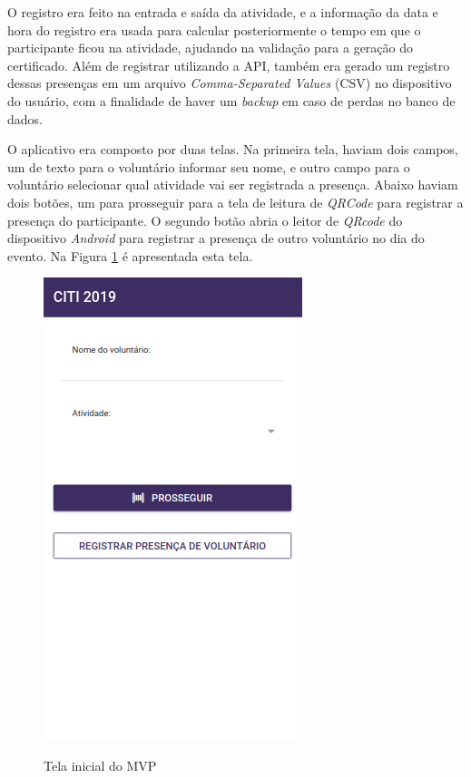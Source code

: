O registro era feito na entrada e saída da atividade, e a informação da data e hora do registro era usada para calcular posteriormente o tempo em que o participante ficou na atividade, ajudando na validação para a geração do certificado. Além de registrar utilizando a API, também era gerado um registro dessas presenças em um arquivo \textit{Comma-Separated Values} (CSV) no dispositivo do usuário, com a finalidade de haver um \textit{backup} em caso de perdas no banco de dados.

O aplicativo era composto por duas telas. Na primeira tela, haviam dois campos, um de texto para o voluntário informar seu nome, e outro campo para o voluntário selecionar qual atividade vai ser registrada a presença. Abaixo haviam dois botões, um para prosseguir para a tela de leitura de \textit{QRCode} para registrar a presença do participante. O segundo botão abria o leitor de \textit{QRcode} do dispositivo \textit{Android} para registrar a presença de outro voluntário no dia do evento. Na Figura \ref{fig:mvp1} é apresentada esta tela.

\begin{figure}[H]
    \centering
    \caption{Tela inicial do MVP} \includegraphics[scale=0.7]{figuras/mvp1.png}
    \label{fig:mvp1}
\end{figure}

